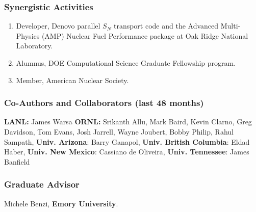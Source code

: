 
\vspace*{-3ex}
\subsubsection*{Synergistic Activities}
\vspace{-1ex}
%
\begin{enumerate}
\item Developer, Denovo parallel $S_N$ transport code and the Advanced
  Multi-Physics (AMP) Nuclear Fuel Performance package at Oak Ridge National
  Laboratory.
\item Alumnus, DOE Computational Science Graduate Fellowship program.
\item Member, American Nuclear Society.
\end{enumerate}


\vspace*{-3ex}
\subsubsection*{Co-Authors and Collaborators (last 48 months)}
\vspace{-1ex}

{\bf LANL:} James Warsa
{\bf ORNL:} Srikanth Allu, Mark Baird, Kevin Clarno, Greg Davidson, Tom Evans,
Josh Jarrell, Wayne Joubert, Bobby Philip, Rahul Sampath,
{\bf Univ. Arizona}: Barry Ganapol,
{\bf Univ. British Columbia}: Eldad Haber,
{\bf Univ. New Mexico}: Cassiano de Oliveira,
{\bf Univ. Tennessee}: James Banfield

\vspace*{-2ex}
\subsubsection*{Graduate Advisor}
\vspace{-1ex}
Michele Benzi, {\bf Emory University}.

\pagebreak
\endinput


